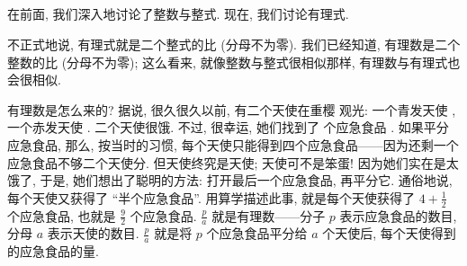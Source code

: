 \subsection*{\RationalExpressions}
\markright{\RationalExpressions}

在前面, 我们深入地讨论了整数与整式. 现在, 我们讨论有理式.

不正式地说, 有理式就是二个整式的比 (分母不为零). 我们已经知道, 有理数是二个整数的比 (分母不为零); 这么看来, 就像整数与整式很相似那样, 有理数与有理式也会很相似.

有理数是怎么来的? 据说, 很久很久以前, 有二个天使在重樱  观光: 一个青发天使 , 一个赤发天使 . 二个天使很饿. 不过, 很幸运, 她们找到了  个应急食品 . 如果平分应急食品, 那么, 按当时的习惯, 每个天使只能得到四个应急食品——因为还剩一个应急食品不够二个天使分. 但天使终究是天使; 天使可不是笨蛋! 因为她们实在是太饿了, 于是, 她们想出了聪明的方法: 打开最后一个应急食品, 再平分它. 通俗地说, 每个天使又获得了 ``半个应急食品''. 用算学描述此事, 就是每个天使获得了 $4 + \frac{1}{2}$ 个应急食品, 也就是 $\frac{9}{2}$ 个应急食品. $\frac{p}{a}$ 就是有理数——分子 $p$ 表示应急食品的数目, 分母 $a$ 表示天使的数目. $\frac{p}{a}$ 就是将 $p$ 个应急食品平分给 $a$ 个天使后, 每个天使得到的应急食品的量.

